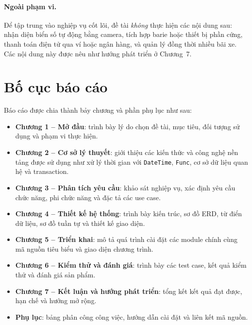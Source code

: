 \paragraph{Ngoài phạm vi.} Để tập trung vào nghiệp vụ cốt lõi, đề tài \textit{không} thực hiện các nội dung sau: nhận diện biển số tự động bằng camera, tích hợp barie hoặc thiết bị phần cứng, thanh toán điện tử qua ví hoặc ngân hàng, và quản lý đồng thời nhiều bãi xe. Các nội dung này được nêu như hướng phát triển ở Chương~7.

\section{Bố cục báo cáo}

Báo cáo được chia thành bảy chương và phần phụ lục như sau:

\begin{itemize}
  \item \textbf{Chương 1 -- Mở đầu}: trình bày lý do chọn đề tài, mục tiêu, đối tượng sử dụng và phạm vi thực hiện.
  \item \textbf{Chương 2 -- Cơ sở lý thuyết}: giới thiệu các kiến thức và công nghệ nền tảng được sử dụng như xử lý thời gian với \texttt{DateTime}, \texttt{Func}, cơ sở dữ liệu quan hệ và transaction.
  \item \textbf{Chương 3 -- Phân tích yêu cầu}: khảo sát nghiệp vụ, xác định yêu cầu chức năng, phi chức năng và đặc tả các use case.
  \item \textbf{Chương 4 -- Thiết kế hệ thống}: trình bày kiến trúc, sơ đồ ERD, từ điển dữ liệu, sơ đồ tuần tự và thiết kế giao diện.
  \item \textbf{Chương 5 -- Triển khai}: mô tả quá trình cài đặt các module chính cùng mã nguồn tiêu biểu và giao diện chương trình.
  \item \textbf{Chương 6 -- Kiểm thử và đánh giá}: trình bày các test case, kết quả kiểm thử và đánh giá sản phẩm.
  \item \textbf{Chương 7 -- Kết luận và hướng phát triển}: tổng kết kết quả đạt được, hạn chế và hướng mở rộng.
  \item \textbf{Phụ lục}: bảng phân công công việc, hướng dẫn cài đặt và liên kết mã nguồn.
\end{itemize}